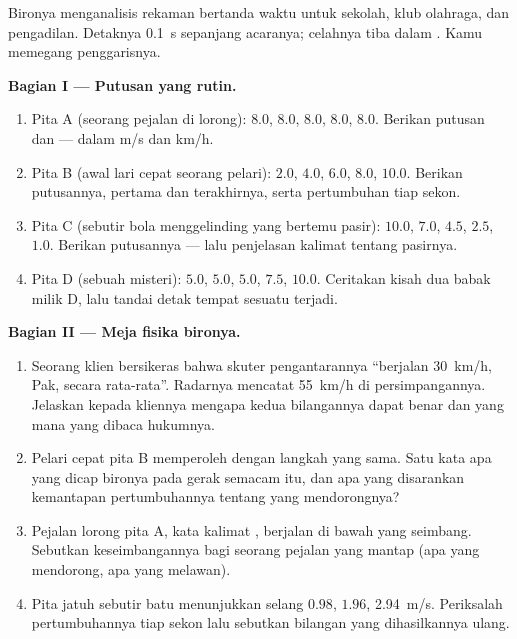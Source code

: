 \begin{problem}\label{pb:g9:uniform-varied-motion:1}
Bironya menganalisis rekaman bertanda waktu untuk sekolah, klub
olahraga, dan pengadilan. Detaknya \qty{0.1}{s} sepanjang acaranya;
celahnya tiba dalam . Kamu memegang penggarisnya.

\medskip\noindent\textbf{Bagian I --- Putusan yang rutin.}
\begin{enumerate}
  \item Pita A (seorang pejalan di lorong): $8.0$, $8.0$, $8.0$,
        $8.0$, $8.0$. Berikan putusan dan  --- dalam
        \unit{m/s} dan \unit{km/h}.
  \item Pita B (awal lari cepat seorang pelari): $2.0$, $4.0$, $6.0$,
        $8.0$, $10.0$. Berikan putusannya,  pertama dan
        terakhirnya, serta pertumbuhan  tiap sekon.
  \item Pita C (sebutir bola menggelinding yang bertemu pasir):
        $10.0$, $7.0$, $4.5$, $2.5$, $1.0$. Berikan putusannya ---
        lalu penjelasan kalimat  tentang pasirnya.
  \item Pita D (sebuah misteri): $5.0$, $5.0$, $5.0$, $7.5$,
        $10.0$. Ceritakan kisah dua babak milik D, lalu tandai detak
        tempat sesuatu terjadi.
\end{enumerate}

\medskip\noindent\textbf{Bagian II --- Meja fisika
bironya.}
\begin{enumerate}[resume]
  \item Seorang klien bersikeras bahwa skuter pengantarannya
        ``berjalan \qty{30}{km/h}, Pak, secara rata-rata''. Radarnya
        mencatat \qty{55}{km/h} di persimpangannya. Jelaskan kepada
        kliennya mengapa kedua bilangannya dapat benar dan yang mana
        yang dibaca hukumnya.
  \item Pelari cepat pita B memperoleh  dengan langkah yang
        sama. Satu kata apa yang dicap bironya pada gerak semacam
        itu, dan apa yang disarankan kemantapan pertumbuhannya tentang
         yang mendorongnya?
  \item Pejalan lorong pita A, kata kalimat , berjalan di
        bawah  yang seimbang. Sebutkan keseimbangannya bagi
        seorang pejalan yang mantap (apa yang mendorong, apa yang
        melawan).
  \item Pita jatuh sebutir batu menunjukkan  selang $0.98$,
        $1.96$, \qty{2.94}{m/s}. Periksalah pertumbuhannya tiap sekon
        lalu sebutkan bilangan yang dihasilkannya ulang.
\end{enumerate}


\end{problem}
